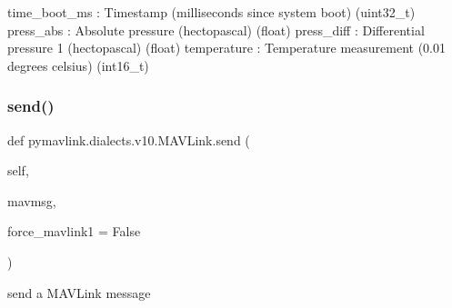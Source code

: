\begin{DoxyVerb}
\begin{DoxyVerb}
\begin{DoxyVerb}
\begin{DoxyVerb}
\begin{DoxyVerb}
\begin{DoxyVerb}
\begin{DoxyVerb}
\begin{DoxyVerb}
\begin{DoxyVerb}
\begin{DoxyVerb}
\begin{DoxyVerb}
time_boot_ms              : Timestamp (milliseconds since system boot) (uint32_t)
press_abs                 : Absolute pressure (hectopascal) (float)
press_diff                : Differential pressure 1 (hectopascal) (float)
temperature               : Temperature measurement (0.01 degrees celsius) (int16_t)\end{DoxyVerb}
 \mbox{\label{classpymavlink_1_1dialects_1_1v10_1_1MAVLink_ac0ae1945236cfbce9c1838f0b5d77057}} 
\subsubsection{\texorpdfstring{send()}{send()}}
{\footnotesize\ttfamily def pymavlink.\+dialects.\+v10.\+M\+A\+V\+Link.\+send (\begin{DoxyParamCaption}\item[{}]{self,  }\item[{}]{mavmsg,  }\item[{}]{force\+\_\+mavlink1 = {\ttfamily False} }\end{DoxyParamCaption})}

\begin{DoxyVerb}send a MAVLink message\end{DoxyVerb}
 \mbox{\label{classpymavlink_1_1dialects_1_1v10_1_1MAVLink_a7de2499e86948f67fa355f4af4a56b7c}} 

\end{DoxyVerb}
\end{DoxyVerb}
\end{DoxyVerb}
\end{DoxyVerb}
\end{DoxyVerb}
\end{DoxyVerb}
\end{DoxyVerb}
\end{DoxyVerb}
\end{DoxyVerb}
\end{DoxyVerb}
